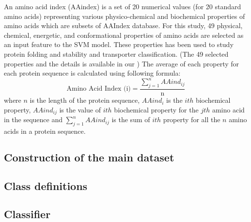     
    An amino acid index (AAindex) is a set of 20 numerical values (for 20 standard amino acids) representing various physico-chemical 
    and biochemical properties of amino acids which are subsets of AAIndex database. \cite{aaindex} For this study, 49 physical, 
    chemical, energetic, and conformational properties of amino acids are selected as an input feature to the SVM model. These properties 
    has been used to study protein folding and stability and transporter classification.
    \cite{zavaljevski2002support, gromiha1999importance, gromiha2006statistical} (The 49 selected properties and the details is 
    available in our ) The average of each property for each protein sequence is calculated using following formula:
    \begin{equation}
        \text{Amino Acid Index (i)} = \frac {\sum_{j=1}^{n} AAind_{ij}} {\text{n}}
    \end{equation}
    where $n$ is the length of the protein sequence, $AAind_{i}$ is the $ith$ biochemical property, $AAind_{ij}$ is the value of $ith$ 
    biochemical property for the $jth$ amino acid in the sequence and $\sum_{j=1}^{n} AAind_{ij}$ is the sum of $ith$ property for all the
    $n$ amino acids in a protein sequence.

    \subsection{Construction of the main dataset}

    \subsection{Class definitions}

    \subsection{Classifier}
        

